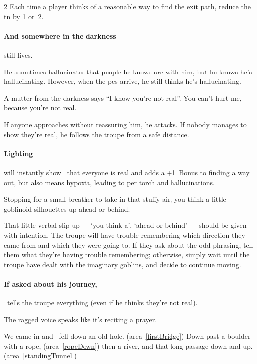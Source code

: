 \begin{multicols}{2}
Each time a player thinks of a reasonable way to find the exit path, reduce the \gls{tn} by 1 or~2.

\paragraph{And somewhere in the darkness}
 still lives.

He sometimes hallucinates that people he knows are with him, but he knows he's hallucinating.
However, when the \glspl{pc} arrive, he still thinks he's hallucinating.

\begin{boxtext}
  A mutter from the darkness says ``I know you're not real''.
  You can't hurt me, because you're not real.
\end{boxtext}

If anyone approaches without reassuring him, he attacks.
If nobody manages to show they're real, he follows the troupe from a safe distance.

\paragraph{Lighting }
will instantly show \scaredFodder\ that everyone is real and adds a +1~Bonus to finding a way out, but also means \gls{hypoxia}, leading to  per \gls{torch} and hallucinations.

\begin{boxtext}
  Stopping for a small breather to take in that stuffy air, you think a little goblinoid silhouettes up ahead or behind.
\end{boxtext}

That little verbal slip-up --- `you think a', `ahead or behind' --- should be given with intention.
The troupe will have trouble remembering which direction they came from and which they were going to.
If they ask about the odd phrasing, tell them what they're having trouble remembering; otherwise, simply wait until the troupe have dealt with the imaginary goblins, and decide to continue moving.

\paragraph{If asked about his journey,}
\scaredFodder\ tells the troupe everything (even if he thinks they're not real).

\begin{boxtext}[]
  The ragged voice speaks like it's reciting a prayer.
  \begin{speechtext}
    We came in and \composeHumanName\ fell down an old hole.
    {\sffamily\upshape(\gls{area}~\vref{firstBridge})}
    Down past a boulder with a rope,
    {\sffamily\upshape(\gls{area}~\ref{ropeDown})}
    then a river, and that long passage down and up.
    {\sffamily\upshape(\gls{area}~\ref{standingTunnel})}


\end{speechtext}
\end{boxtext}
\end{multicols}
